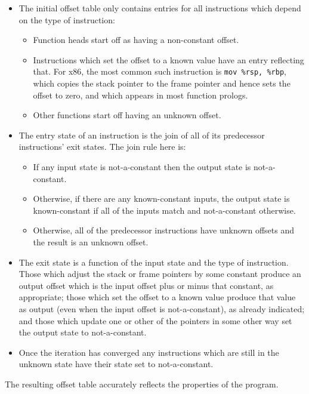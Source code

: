 \begin{itemize}
\item
  The initial offset table only contains entries for all instructions
  which depend on the type of instruction:

  \begin{itemize}
  \item Function heads start off as having a non-constant offset.
  \item Instructions which set the offset to a known value have an
    entry reflecting that.  For x86, the most common such instruction
    is \verb|mov %rsp, %rbp|, which copies the stack pointer to the
    frame pointer and hence sets the offset to zero, and which appears in
    most function prologs.
  \item Other functions start off having an unknown offset.
  \end{itemize}
\item
  The entry state of an instruction is the join of all of its
  predecessor instructions' exit states.  The join rule here
  is:

  \begin{itemize}
  \item
    If any input state is not-a-constant then the output state is
    not-a-constant.
  \item
    Otherwise, if there are any known-constant inputs, the output
    state is known-constant if all of the inputs match and
    not-a-constant otherwise.
  \item
    Otherwise, all of the predecessor instructions have unknown
    offsets and the result is an unknown offset.
  \end{itemize}
\item
  The exit state is a function of the input state and the type of
  instruction.  Those which adjust the stack or frame pointers by some
  constant produce an output offset which is the input offset plus or
  minus that constant, as appropriate; those which set the offset to a
  known value produce that value as output (even when the input offset
  is not-a-constant), as already indicated; and those which update one
  or other of the pointers in some other way set the output state to
  not-a-constant.
\item
  Once the iteration has converged any instructions which are still in
  the unknown state have their state set to not-a-constant.
\end{itemize}

The resulting offset table accurately reflects the properties of the
program.

